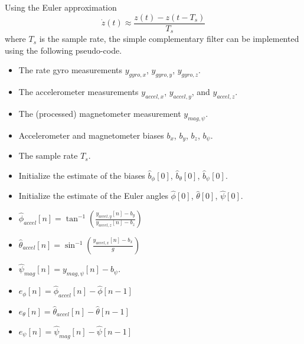 Using the Euler approximation
\[
\dot{z}(t) \approx \frac{z(t)-z(t-T_s)}{T_s}
\]
where $T_s$ is the sample rate, the simple complementary filter can be implemented using the following pseudo-code.

\par{}
\begin{itemize}
\item The rate gyro measurements $y_{gyro,x}$, $y_{gyro,y}$, $y_{gyro,z}$.
\item The accelerometer measurements $y_{accel,x}$, $y_{accel,y}$, and $y_{accel,z}$.
\item The (processed) magnetometer measurement $y_{mag,\psi}$.
\item Accelerometer and magnetometer biases $b_x$, $b_y$, $b_z$, $b_\psi$.
\item The sample rate $T_s$.
\end{itemize}

\par{}
\begin{itemize}
\item Initialize the estimate of the biases $\hat{b}_\phi[0]$, $\hat{b}_\theta[0]$, $\hat{b}_\psi[0]$.
\item Initialize the estimate of the Euler angles $\hat{\phi}[0]$, $\hat{\theta}[0]$, $\hat{\psi}[0]$.
\end{itemize}


\par{}
\begin{itemize}
\item $\hat{\phi}_{accel}[n] = \tan^{-1}\left(\frac{y_{accel,y}[n]-b_y}{y_{accel,z}[n]-b_z}\right)$ \\
\item $\hat{\theta}_{accel}[n] = \sin^{-1}\left(\frac{y_{accel,x}[n]-b_x}{g}\right)$ \\
\item $\hat{\psi}_{mag}[n] = y_{mag,\psi}[n]-b_\psi$.
\end{itemize}

\par{}
\begin{itemize}
\item $e_\phi[n] = \hat{\phi}_{accel}[n]-\hat{\phi}[n-1]$
\item $e_\theta[n] = \hat{\theta}_{accel}[n]-\hat{\theta}[n-1]$
\item $e_\psi[n] = \hat{\psi}_{mag}[n]-\hat{\psi}[n-1]$
\end{itemize}

